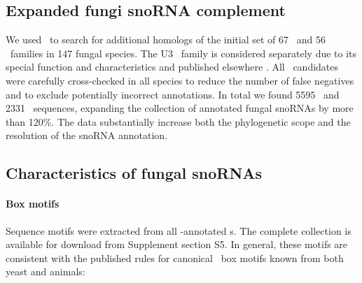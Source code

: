 

\subsection{Expanded fungi snoRNA complement}

We used \snostrip\ to search for additional homologs of the initial
set of 67 \cd\ and 56 \haca\ families in 147 fungal species. The U3
\sno\ family is considered separately due to its special function and
characteristics and published elsewhere \cite{Canzler:2017}. All
\snostrip\ candidates were carefully cross-checked in all species to
reduce the number of false negatives and to exclude potentially
incorrect annotations.  In total we found 5595 \cd\ and 2331 \haca\
sequences, expanding the collection of annotated fungal snoRNAs by
more than 120\%. The data substantially increase both the phylogenetic
scope and the resolution of the snoRNA annotation.

\subsection{Characteristics of fungal snoRNAs}

\paragraph{\textbf{Box motifs}} Sequence motifs were extracted from
all \snostrip-annotated \sno s. The complete collection is available
for download from Supplement section S5. In general, these motifs are
consistent with the published rules \cite{Xia:1997, Watkins:2000,
  Cahill:2002, Watkins:2002} for canonical \sno\ box motifs known from
both yeast and animals:


